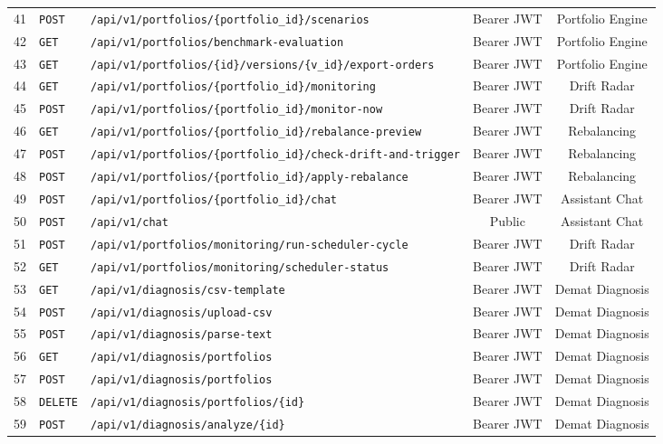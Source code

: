 \begin{small}
\begin{xltabular}{\textwidth}{llp{7.2cm}cc}
41 & \texttt{POST} & \texttt{/api/v1/portfolios/\{portfolio\_id\}/scenarios} & Bearer JWT & Portfolio Engine \\
42 & \texttt{GET} & \texttt{/api/v1/portfolios/benchmark-evaluation} & Bearer JWT & Portfolio Engine \\
43 & \texttt{GET} & \texttt{/api/v1/portfolios/\{id\}/versions/\{v\_id\}/export-orders} & Bearer JWT & Portfolio Engine \\
44 & \texttt{GET} & \texttt{/api/v1/portfolios/\{portfolio\_id\}/monitoring} & Bearer JWT & Drift Radar \\
45 & \texttt{POST} & \texttt{/api/v1/portfolios/\{portfolio\_id\}/monitor-now} & Bearer JWT & Drift Radar \\
46 & \texttt{GET} & \texttt{/api/v1/portfolios/\{portfolio\_id\}/rebalance-preview} & Bearer JWT & Rebalancing \\
47 & \texttt{POST} & \texttt{/api/v1/portfolios/\{portfolio\_id\}/check-drift-and-trigger} & Bearer JWT & Rebalancing \\
48 & \texttt{POST} & \texttt{/api/v1/portfolios/\{portfolio\_id\}/apply-rebalance} & Bearer JWT & Rebalancing \\
49 & \texttt{POST} & \texttt{/api/v1/portfolios/\{portfolio\_id\}/chat} & Bearer JWT & Assistant Chat \\
50 & \texttt{POST} & \texttt{/api/v1/chat} & Public & Assistant Chat \\
51 & \texttt{POST} & \texttt{/api/v1/portfolios/monitoring/run-scheduler-cycle} & Bearer JWT & Drift Radar \\
52 & \texttt{GET} & \texttt{/api/v1/portfolios/monitoring/scheduler-status} & Bearer JWT & Drift Radar \\
53 & \texttt{GET} & \texttt{/api/v1/diagnosis/csv-template} & Bearer JWT & Demat Diagnosis \\
54 & \texttt{POST} & \texttt{/api/v1/diagnosis/upload-csv} & Bearer JWT & Demat Diagnosis \\
55 & \texttt{POST} & \texttt{/api/v1/diagnosis/parse-text} & Bearer JWT & Demat Diagnosis \\
56 & \texttt{GET} & \texttt{/api/v1/diagnosis/portfolios} & Bearer JWT & Demat Diagnosis \\
57 & \texttt{POST} & \texttt{/api/v1/diagnosis/portfolios} & Bearer JWT & Demat Diagnosis \\
58 & \texttt{DELETE} & \texttt{/api/v1/diagnosis/portfolios/\{id\}} & Bearer JWT & Demat Diagnosis \\
59 & \texttt{POST} & \texttt{/api/v1/diagnosis/analyze/\{id\}} & Bearer JWT & Demat Diagnosis \\

\end{xltabular}
\end{small}
